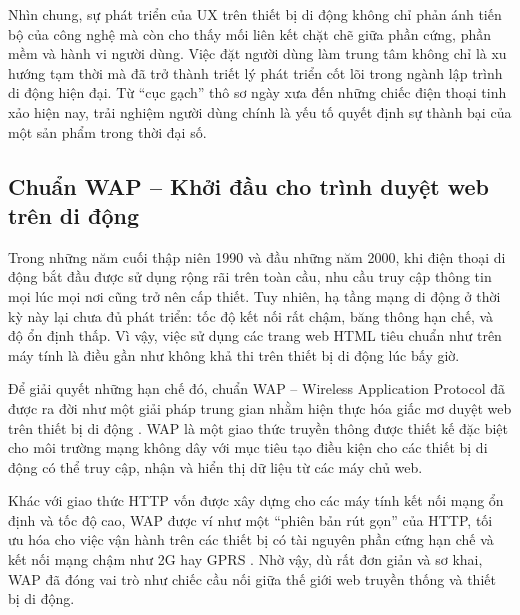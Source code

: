   \begin{flushleft}
    \hspace*{0.8cm}Nhìn chung, sự phát triển của UX trên thiết bị di động không chỉ phản ánh tiến bộ của công nghệ mà còn cho thấy mối liên kết chặt chẽ giữa phần cứng, phần mềm và hành vi người dùng. Việc đặt người dùng làm trung tâm không chỉ là xu hướng tạm thời mà đã trở thành triết lý phát triển cốt lõi trong ngành lập trình di động hiện đại. Từ “cục gạch” thô sơ ngày xưa đến những chiếc điện thoại tinh xảo hiện nay, trải nghiệm người dùng chính là yếu tố quyết định sự thành bại của một sản phẩm trong thời đại số.
  \end{flushleft}

\subsection{Chuẩn WAP – Khởi đầu cho trình duyệt web trên di động}
\renewcommand{\labelitemi}{--}    
\begin{flushleft}
  \hspace*{0.8cm}Trong những năm cuối thập niên 1990 và đầu những năm 2000, khi điện thoại di động bắt đầu được sử dụng rộng rãi trên toàn cầu, nhu cầu truy cập thông tin mọi lúc mọi nơi cũng trở nên cấp thiết. Tuy nhiên, hạ tầng mạng di động ở thời kỳ này lại chưa đủ phát triển: tốc độ kết nối rất chậm, băng thông hạn chế, và độ ổn định thấp. Vì vậy, việc sử dụng các trang web HTML tiêu chuẩn như trên máy tính là điều gần như không khả thi trên thiết bị di động lúc bấy giờ.
  \end{flushleft}
  
  \begin{flushleft}
  \hspace*{0.8cm}Để giải quyết những hạn chế đó, chuẩn WAP – Wireless Application Protocol đã được ra đời như một giải pháp trung gian nhằm hiện thực hóa giấc mơ duyệt web trên thiết bị di động \cite{wap-intro}. WAP là một giao thức truyền thông được thiết kế đặc biệt cho môi trường mạng không dây với mục tiêu tạo điều kiện cho các thiết bị di động có thể truy cập, nhận và hiển thị dữ liệu từ các máy chủ web.
  \end{flushleft}
  
  \begin{flushleft}
  \hspace*{0.8cm}Khác với giao thức HTTP vốn được xây dựng cho các máy tính kết nối mạng ổn định và tốc độ cao, WAP được ví như một “phiên bản rút gọn” của HTTP, tối ưu hóa cho việc vận hành trên các thiết bị có tài nguyên phần cứng hạn chế và kết nối mạng chậm như 2G hay GPRS \cite{wap-vs-http}. Nhờ vậy, dù rất đơn giản và sơ khai, WAP đã đóng vai trò như chiếc cầu nối giữa thế giới web truyền thống và thiết bị di động.
  \end{flushleft}
  

